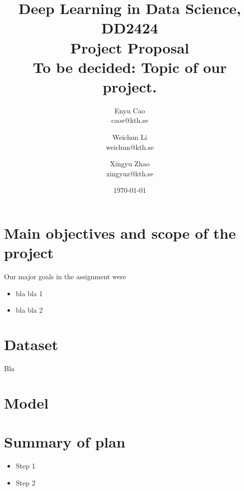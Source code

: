 \documentclass[a4paper]{article}
\begin{document}
\title{\large Deep Learning in Data Science, DD2424\\
\vspace{3mm}
\huge Project Proposal\\[1ex]
\Large To be decided: Topic of our project. }

\author{
  Enyu Cao  \\ caoe@kth.se
  \and 
  Weichun Li  \\ weichun@kth.se
  \and
  Xingyu Zhao  \\ xingyuz@kth.se
  }
\date{\today}  %
\maketitle     %


\section{Main objectives and scope of the project}

Our major goals in the assignment were  \cite{texbook}


\begin{itemize}
\item bla bla 1
\item  bla bla 2
\end{itemize}

\section{Dataset}

Bla 

\section{Model}

\section{Summary of plan}

\begin{itemize}
\item Step 1
\item Step 2
\end{itemize}

\end{document}
